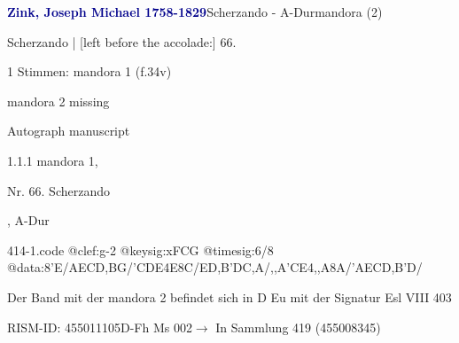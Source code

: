 \documentclass[twocolumn]{book}
\begin{document}
\par \vspace{7pt} \textcolor{darkblue}{\textbf{Zink, Joseph Michael  1758-1829}}\hfillplus{\textbf{[414]}}\newline Scherzando - A-Dur\newline mandora (2)
\par \begin{itshape}[f.34v, at left:] Scherzando | [left before the accolade:] 66.\end{itshape} 
\par \textcolor{darkblue}{}  1 Stimmen: mandora 1  (f.34v)\newline \begin{small} mandora 2 missing\end{small} \newline Autograph manuscript
\par 1.1.1  mandora 1, \begin{itshape}Nr. 66. Scherzando\end{itshape}, A-Dur  
\begin{filecontents*}{414-1.code}
@clef:g-2
@keysig:xFCG
@timesig:6/8
@data:8'E/AECD,BG/'CDE4E8C/ED,B'DC,A/,,A'CE4,,A8A/'AECD,B'D/
\end{filecontents*}
\newline
%
\par Der Band mit der mandora 2 befindet sich in D Eu mit der Signatur Esl VIII 403
\par RISM-ID: 455011105\newline D-Fh  Ms 002\newline $\rightarrow$ In Sammlung 419 (455008345)
      
\end{document}
